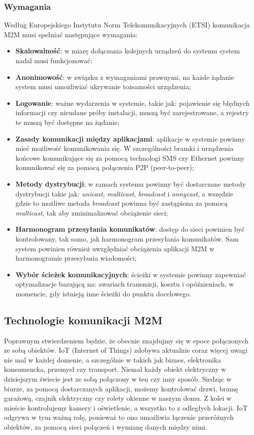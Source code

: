 \subsubsection{Wymagania}
Według Europejskiego Instytutu Norm Telekomunikacyjnych (ETSI) komunikacja M2M musi spełniać następujące wymagania:
\begin{itemize}
  \item \textbf{Skalowalność}: w miarę dołączania kolejnych urządzeń do systemu system nadal musi funkcjonować;
  \item \textbf{Anonimowość}: w związku z wymaganiami prawnymi, na każde żądanie system musi umożliwiać ukrywanie tożsamości urządzenia;
  \item \textbf{Logowanie}: ważne wydarzenia w systemie, takie jak: pojawienie się błędnych informacji czy nieudane próby instalacji, muszą być zarejestrowane, a rejestry te muszą być dostępne na żądanie;
  \item \textbf{Zasady komunikacji między aplikacjami}: aplikacje w systemie powinny mieć możliwość komunikowania się. W szczególności bramki i urządzenia końcowe komunikujące się za pomocą technologi SMS czy Ethernet powinny komunikować się za pomocą połączenia P2P (peer-to-peer);
  \item \textbf{Metody dystrybucji}: w ramach systemu powinny być dostarczane metody dystrybucji takie jak: \emph{unicast}, \emph{multicast}, \emph{broadcast} i \emph{annycast}, a wszędzie gdzie to możliwe metoda \emph{broadcast} powinna być zastąpiona za pomocą \emph{multicast}, tak aby zminimalizować obciążenie sieci;
  \item \textbf{Harmonogram przesyłania komunikatów}: dostęp do sieci powinien być kontrolowany, tak samo, jak harmonogram przesyłania komunikatów. Sam system powinien również uwzględniać obciążenia aplikacji M2M w harmonogramie przesyłania wiadomości;
  \item \textbf{Wybór ścieżek komunikacyjnych}: ścieżki w systemie powinny zapewniać optymalizacje bazującą na: awariach transmisji, kosztu i opóźnieniach, w momencie, gdy istnieją inne ścieżki do punktu docelowego. \cite{m2m-web}
\end{itemize}

\subsection{Technologie komunikacji M2M}
Poprawnym stwierdzeniem będzie, że obecnie znajdujmy się w epoce połączonych ze sobą obiektów. IoT (Internet of Things) zdobywa aktualnie coraz więcej uwagi nie mal w każdej domenie, a szczególnie w takich jak biznes, elektronika konsumencka, przemysł czy transport. Niemal każdy obiekt elektryczny w dzisiejszym świecie jest ze sobą połączony w ten czy inny sposób. Siedząc w biurze, za pomocą dostarczanych aplikacji, możemy kontrolować drzwi, bramę garażową, czajnik elektryczny czy rolety okienne w naszym domu. Z kolei w mieście kontrolujemy kamery i oświetlenie, a wszystko to z odległych lokacji. IoT odgrywa w tym ważną rolę, ponieważ to ono umożliwia łączenie przeróżnych obiektów, za pomocą sieci połączeń i wymianę danych między nimi.\cite{LoRa-article}


